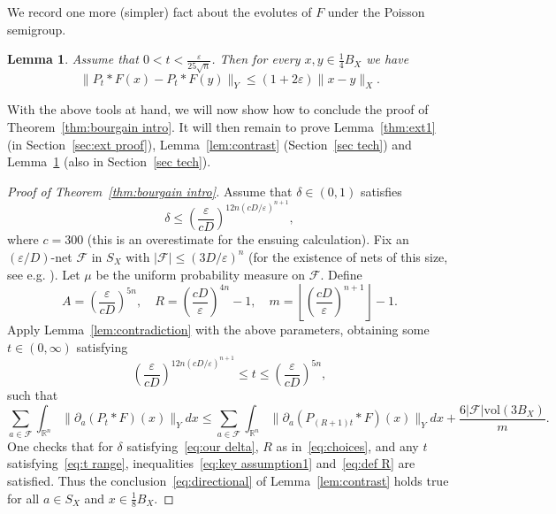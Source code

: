 \documentclass[12pt,reqno]{amsart}
\theoremstyle{plain}
\newtheorem{lemma}[theorem]{Lemma}
\theoremstyle{definition}
\newcommand{\e}{\varepsilon}
\renewcommand{\d}{\delta}
\renewcommand{\le}{\leqslant}
\newcommand{\R}{\mathbb R}
\newcommand{\vol}{\mathrm{vol}}
\begin{document}
We record one more (simpler) fact about the evolutes of $F$ under the Poisson semigroup.

\begin{lemma}\label{le:evolute Lip}
Assume that $0<t<\frac{\e}{25\sqrt{n}}$. Then for every $x,y\in \frac14 B_X$ we have
$$
\|P_t*F(x)-P_t*F(y)\|_Y\le (1+2\e)\|x-y\|_X.
$$
\end{lemma}


With the above tools at hand, we will now show how to conclude the proof of Theorem~\ref{thm:bourgain intro}. It will then remain to prove Lemma~\ref{thm:ext1} (in Section~\ref{sec:ext proof}), Lemma~\ref{lem:contrast} (Section~\ref{sec tech}) and Lemma~\ref{le:evolute Lip} (also in Section~\ref{sec tech}).

\begin{proof}[Proof of Theorem~\ref{thm:bourgain intro}] Assume that $\delta\in (0,1)$ satisfies
\begin{equation}\label{eq:our delta}
\d\le \left(\frac{\e}{cD}\right)^{12n(cD/\e)^{n+1}},
\end{equation}
where $c=300$ (this is an overestimate for the ensuing calculation). Fix  an $(\e/D)$-net $\mathcal F$ in $S_X$ with $|\mathcal F|\le (3D/\e)^n$ (for the existence of nets of this size, see e.g. \cite[Lem.~12.3.1]{Kal06}). Let $\mu$ be the uniform probability measure on $\mathcal F$. Define
\begin{equation}\label{eq:choices}
A=\left(\frac{\e}{cD}\right)^{5n},\quad R=\left(\frac{cD}{\e}\right)^{4n}-1,\quad m=\left\lfloor\left(\frac{cD}{\e}\right)^{n+1}\right\rfloor-1.
\end{equation}
Apply Lemma~\ref{lem:contradiction} with the above parameters, obtaining some $t\in (0,\infty)$ satisfying
\begin{equation}\label{eq:t range}
\left(\frac{\e}{cD}\right)^{12n\left(cD/\e\right)^{n+1}}\le t\le \left(\frac{\e}{cD}\right)^{5n},
\end{equation}
such that
\begin{equation}\label{eq:stabilization net}
\sum_{a\in \mathcal F}\int_{\R^n} \|\partial_a(P_t*F)(x)\|_Ydx\le \sum_{a\in \mathcal F}\int_{\R^n} \|\partial_a(P_{(R+1)t}*F)(x)\|_Ydx+\frac{6|\mathcal F|\vol(3B_X)}{m}.
\end{equation}
One checks that for $\delta$ satisfying~\eqref{eq:our delta}, $R$ as in~\eqref{eq:choices}, and any $t$ satisfying~\eqref{eq:t range}, inequalities~\eqref{eq:key assumption1} and~\eqref{eq:def R} are satisfied. Thus the conclusion~\eqref{eq:directional} of Lemma~\ref{lem:contrast} holds true for all $a\in S_X$ and $x\in \frac18 B_X$.




\end{proof}
\end{document}
